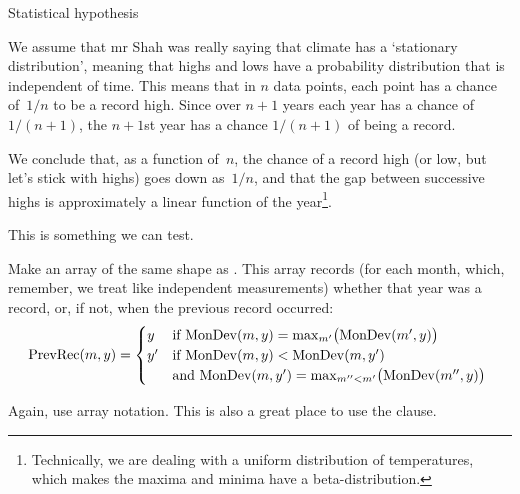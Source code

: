 \begin{comment}
\end{comment}

\begin{comment}
\begin{verbatim}
DATAFILE = GLB.Ts.txt
run_annual : annual
	@(    cat ${DATAFILE} | grep '^[12]' | grep -v 2018 | wc -l \
	   && cat ${DATAFILE} | grep '^[12]' | grep -v 2018 \
	 ) | ./annual
\end{verbatim}
\end{comment}

 {Statistical hypothesis}

We assume that mr Shah was really saying that climate has a
`stationary distribution', meaning that highs and lows have a
probability distribution that is independent of time.
This means that in $n$ data points, each point has a chance
of~$1/n$ to be a record high. Since over $n+1$ years each year has a
chance of $1/(n+1)$, the $n+1$st year has a chance $1/(n+1)$ of being a
record.

We conclude that, as a function
of~$n$, the chance of a record high (or low, but let's stick with
highs) goes down as~$1/n$, and that the gap between successive highs
is approximately a linear function of the year\footnote {Technically,
  we are dealing with a uniform distribution of temperatures, which
  makes the maxima and minima have a beta-distribution.}.

This is something we can test.

\begin{exercise}
  Make an array  of the same shape as
  . This array records (for each month, which,
  remember, we treat like independent measurements) whether
  that year was a record, or, if not, when the previous record
  occurred:
  \[ \mathrm{PrevRec}(m,y) = 
  \begin{cases}
    y&\hbox{if
      $\mathrm{MonDev}(m,y) = \max_{m'} \bigl( \mathrm{MonDev}(m',y)\bigr)$
    }\\
    y'&\hbox{if
      $\mathrm{MonDev}(m,y) < \mathrm{MonDev}(m,y')$ }\\
      &\hbox{and
      $\mathrm{MonDev}(m,y') = \max_{m''<m'}\bigl( \mathrm{MonDev}(m'',y)\bigr)$
    }\\
  \end{cases}
  \]

  Again, use array notation. This is also a great place to use the
   clause.
\end{exercise}

